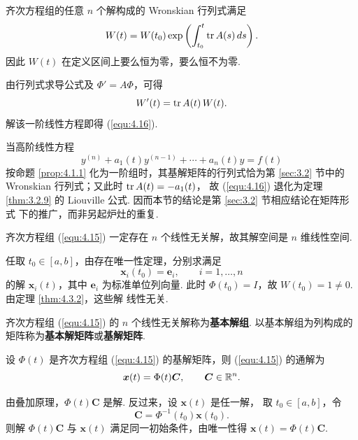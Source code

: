 \begin{thm}[(Liouville 公式)]\label{thm:4.3.3}
齐次方程组的任意 $n$ 个解构成的 Wronskian 行列式满足
\begin{equation}\label{equ:4.16}
W(t)=W(t_0)
\exp\left(\int_{t_0}^{t}\operatorname{tr} A(s)\,ds\right).
\end{equation}
因此 $W(t)$ 在定义区间上要么恒为零，要么恒不为零.
\end{thm}

\begin{pf1}
由行列式求导公式及 $\Phi'=A\Phi$，可得
\[
W'(t)=\operatorname{tr} A(t)\,W(t).
\]
解该一阶线性方程即得 (\ref{equ:4.16}).
\end{pf1}

\begin{rmk}
当高阶线性方程
\[
y^{(n)}+a_1(t)y^{(n-1)}+\cdots+a_n(t)y=f(t)
\]
按命题 \ref{prop:4.1.1} 化为一阶组时，其基解矩阵的行列式恰为第
\ref{sec:3.2} 节中的 Wronskian 行列式；又此时 $\operatorname{tr} A(t)=-a_1(t)$，
故 (\ref{equ:4.16}) 退化为定理 \ref{thm:3.2.9} 的
Liouville 公式. 因而本节的结论是第 \ref{sec:3.2} 节相应结论在矩阵形式
下的推广，而非另起炉灶的重复.
\end{rmk}

\begin{thm}\label{thm:4.3.4}
齐次方程组 (\ref{equ:4.15}) 一定存在 $n$ 个线性无关解，故其解空间是
$n$ 维线性空间.
\end{thm}

\begin{pf1}
任取 $t_0\in[a,b]$，由存在唯一性定理，分别求满足
\[
\bm{x}_i(t_0)=\bm{e}_i,\qquad i=1,\ldots,n
\]
的解 $\bm{x}_i(t)$，其中 $\bm{e}_i$ 为标准单位列向量. 此时
$\Phi(t_0)=I$，故 $W(t_0)=1\ne0$. 由定理 \ref{thm:4.3.2}，这些解
线性无关.
\end{pf1}

\begin{deff}[(基解矩阵)]
齐次方程组 (\ref{equ:4.15}) 的 $n$ 个线性无关解称为\textbf{基本解组}.
以基本解组为列构成的矩阵称为\textbf{基本解矩阵}或\textbf{基解矩阵}.
\end{deff}

\begin{thm}\label{thm:4.3.5}
设 $\Phi(t)$ 是齐次方程组 (\ref{equ:4.15}) 的基解矩阵，则
(\ref{equ:4.15}) 的通解为
\begin{equation}\label{equ:4.17}
\bm{x}(t)=\Phi(t)\bm{C},
\qquad \bm{C}\in\mathbb{R}^n.
\end{equation}
\end{thm}

\begin{pf1}
由叠加原理，$\Phi(t)\bm{C}$ 是解. 反过来，设 $\bm{x}(t)$ 是任一解，
取 $t_0\in[a,b]$，令
\[
\bm{C}=\Phi^{-1}(t_0)\bm{x}(t_0).
\]
则解 $\Phi(t)\bm{C}$ 与 $\bm{x}(t)$ 满足同一初始条件，由唯一性得
$\bm{x}(t)=\Phi(t)\bm{C}$.
\end{pf1}

